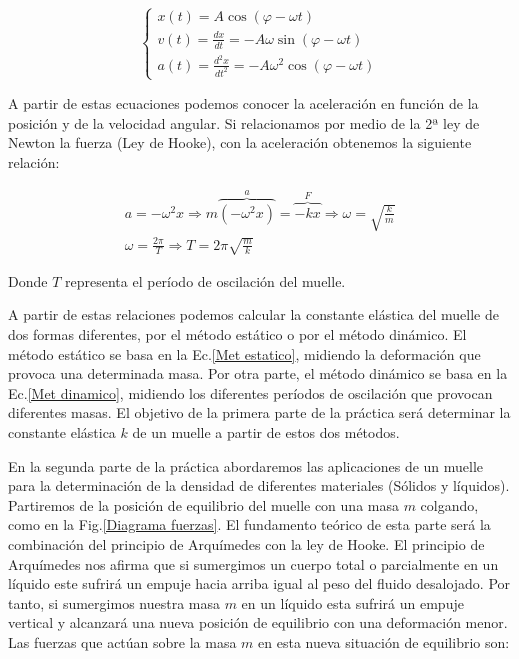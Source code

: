 \documentclass[a4paper,12pt,titlepage]{report}
\begin{document}
\begin{equation}
    \left\{ \begin{array}{l}
        x(t) = A \cos (\varphi - \omega t) \\
        v(t) = \frac{dx}{dt} = -A \omega \sin (\varphi - \omega t) \\
        a(t) = \frac{d^2x}{dt^2} = -A \omega^2 \cos (\varphi - \omega t)
        \end{array}
    \right.
\end{equation}

A partir de estas ecuaciones podemos conocer la aceleración en función de la posición y de la velocidad angular. Si relacionamos por medio de la 2ª ley de Newton la fuerza (Ley de Hooke), con la aceleración obtenemos la siguiente relación:

\begin{equation}
    \begin{gathered}
    a = -\omega^2 x \Rightarrow m\overbrace{(-\omega^2x)}^a = \overbrace{-kx}^F \Rightarrow \omega = \sqrt{\frac{k}{m}} \\
    \omega = \frac{2\pi}{T} \Rightarrow T= 2\pi \sqrt{\frac{m}{k}}
    \end{gathered}
    \label{Met dinamico}
\end{equation}

Donde $T$ representa el período de oscilación del muelle.

\par A partir de estas relaciones podemos calcular la constante elástica del muelle de dos formas diferentes, por el método estático o por el método dinámico. El método estático se basa en la Ec.\ref{Met estatico}, midiendo la deformación que provoca una determinada masa. Por otra parte, el método dinámico se basa en la Ec.\ref{Met dinamico}, midiendo los diferentes períodos de oscilación que provocan diferentes masas. El objetivo de la primera parte de la práctica será determinar la constante elástica $k$ de un muelle a partir de estos dos métodos.

\par En la segunda parte de la práctica abordaremos las aplicaciones de un muelle para la determinación de la densidad de diferentes materiales (Sólidos y líquidos). Partiremos de la posición de equilibrio del muelle con una masa $m$ colgando, como en la Fig.\ref{Diagrama fuerzas}. El fundamento teórico de esta parte será la combinación del principio de Arquímedes con la ley de Hooke. El principio de Arquímedes nos afirma que si sumergimos un cuerpo total o parcialmente en un líquido este sufrirá un empuje hacia arriba igual al peso del fluido desalojado. Por tanto, si sumergimos nuestra masa $m$ en un líquido esta sufrirá un empuje vertical y alcanzará una nueva posición de equilibrio con una deformación menor. Las fuerzas que actúan sobre la masa $m$ en esta nueva situación de equilibrio son:
\end{document}
